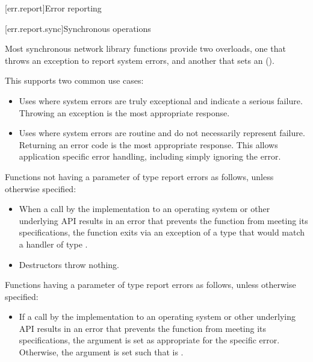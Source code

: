 
[err.report]{Error reporting}


[err.report.sync]{Synchronous operations}

\pnum
Most synchronous network library functions provide two overloads, one that throws an exception to report system errors, and another that sets an  ().

\begin{note} This supports two common use cases:
\begin{itemize}
\item
 Uses where system errors are truly exceptional and indicate a serious failure. Throwing an exception is the most appropriate response.
\item
 Uses where system errors are routine and do not necessarily represent failure. Returning an error code is the most appropriate response. This allows application specific error handling, including simply ignoring the error.
\end{itemize}\end{note}

\pnum
Functions not having a parameter of type  report errors as follows, unless otherwise specified:

\begin{itemize}
\item
When a call by the implementation to an operating system or other underlying API results in an error that prevents the function from meeting its specifications, the function exits via an exception of a type that would match a handler of type .

\item
Destructors throw nothing.
\end{itemize}

\pnum
Functions having a parameter of type  report errors as follows, unless otherwise specified:

\begin{itemize}
\item
If a call by the implementation to an operating system or other underlying API results in an error that prevents the function from meeting its specifications, the  argument  is set as appropriate for the specific error. Otherwise, the  argument is set such that  is .
\end{itemize}

